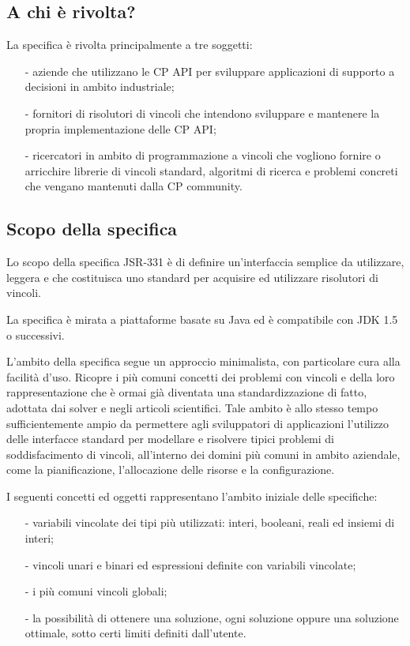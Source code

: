 \subsection{A chi è rivolta?}
La specifica è rivolta principalmente a tre soggetti:
\begin{itemize}
\item[-]aziende che utilizzano le CP API
per sviluppare applicazioni di supporto a decisioni in ambito industriale;
\item[-]fornitori di risolutori di vincoli che intendono sviluppare e mantenere
la propria implementazione delle CP API;
\item[-]ricercatori in ambito di programmazione a vincoli che vogliono 
fornire o arricchire librerie di vincoli standard, algoritmi di ricerca e
problemi concreti che vengano mantenuti dalla CP community.
\end{itemize}

\subsection{Scopo della specifica}
Lo scopo della specifica JSR-331 è di definire un'interfaccia semplice da
utilizzare, leggera e che costituisca uno standard per acquisire ed utilizzare
risolutori di vincoli.

La specifica è mirata a piattaforme basate su Java ed è compatibile con JDK 1.5
o successivi.

L'ambito della specifica segue un approccio minimalista, con particolare cura
alla facilità d'uso. Ricopre i più comuni concetti dei problemi con vincoli e
della loro rappresentazione che è ormai già diventata una standardizzazione
di fatto, adottata dai solver e negli articoli scientifici. Tale ambito è
allo stesso tempo sufficientemente ampio da permettere agli sviluppatori di
applicazioni l'utilizzo delle interfacce standard per modellare
e risolvere tipici problemi di soddisfacimento di vincoli, all'interno
dei domini più comuni in ambito aziendale, come la pianificazione, l'allocazione
delle risorse e la configurazione.

I seguenti concetti ed oggetti rappresentano l'ambito iniziale delle
specifiche:
\begin{itemize}
\item[-]variabili vincolate dei tipi più utilizzati: interi, booleani, reali
ed insiemi di interi;
\item[-]vincoli unari e binari ed espressioni definite con variabili vincolate;
\item[-]i più comuni vincoli globali;
\item[-]la possibilità di ottenere una soluzione, ogni soluzione oppure
una soluzione ottimale, sotto certi limiti definiti dall'utente.
\end{itemize}

